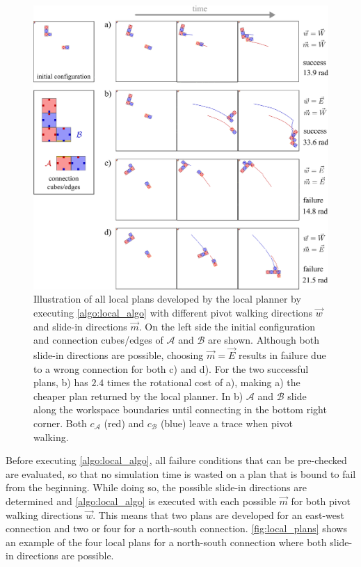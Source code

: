 \begin{figure}
	\centering
	\includegraphics[width=1\textwidth]{figures/local_plans.pdf}
	\caption[Local plans for all pivot walking and slide-in directions]{Illustration of all local plans developed by the local planner by executing \autoref{algo:local_algo} with different pivot walking directions $\vec{w}$ and slide-in directions $\vec{m}$. On the left side the initial configuration and connection cubes/edges of $\mathcal{A}$ and $\mathcal{B}$ are shown. Although both slide-in directions are possible, choosing $\vec{m}=\vec{E}$ results in failure due to a wrong connection for both c) and d). For the two successful plans, b) has $2.4$ times the rotational cost of a), making a) the cheaper plan returned by the local planner. In b) $\mathcal{A}$ and $\mathcal{B}$ slide along the workspace boundaries until connecting in the bottom right corner. Both $c_\mathcal{A}$ (red) and $c_\mathcal{B}$ (blue) leave a trace when pivot walking.}
	\label{fig:local_plans}
\end{figure}

Before executing \autoref{algo:local_algo}, all failure conditions that can be pre-checked are evaluated, so that no simulation time is wasted on a plan that is bound to fail from the beginning.
While doing so, the possible slide-in directions are determined and \autoref{algo:local_algo} is executed with each possible $\vec{m}$ for both pivot walking directions $\vec{w}$.
This means that two plans are developed for an east-west connection and two or four for a north-south connection.
\autoref{fig:local_plans} shows an example of the four local plans for a north-south connection where both slide-in directions are possible.

